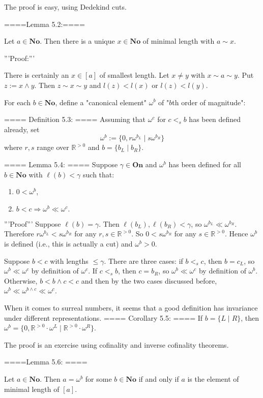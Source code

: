 The proof is easy, using Dedekind cuts.

====Lemma 5.2:====

Let $a\in \mathbf{No}$. Then there is a unique $x\in \mathbf{No}$ of minimal length with $a\sim x$.

'''Proof:'''

There is certainly an $x\in [a]$ of smallest length. Let $x\neq y$ with $x\sim a\sim y$. Put $z:=x\wedge y$. Then $z\sim x\sim y$ and $l(z)<l(x)$ or $l(z)<l(y)$.


For each $b\in\mathbf{No}$, define a "canonical element" $\omega^b$ of "$b$th order of magnitude":

==== Definition 5.3: ====
Assuming that $\omega^c$ for $c<_s b$ has been defined already, set 
$$\omega^b:=\{0,r\omega^{b_L}\mid s\omega^{b_R}\}$$
where $r,s$ range over $\mathbb{R}^{>0}$ and $b=\{b_L\mid b_R\}$.


==== Lemma 5.4: ====
Suppose $\gamma\in \mathbf{On}$ and $\omega^b$ has been defined for all $b\in \mathbf{No}$ with $\ell(b)<\gamma$ such that:
\begin{enumerate}
  \item  $0<\omega^b$,
  \item  $b<c \Rightarrow \omega^b\ll \omega^c.$
\end{enumerate}

'''Proof'''
Suppose $\ell(b)=\gamma$. Then $\ell(b_L),\ell(b_R)<\gamma$, so $\omega^{b_L} \ll \omega^{b_R}$. Therefore $r\omega^{b_L}<s\omega^{b_R}$ for any $r,s\in \mathbb{R}^{>0}$. So $0<s\omega^{b_R}$ for any $s\in \mathbb{R}^{>0}$. Hence $\omega^b$ is defined (i.e., this is actually a cut) and $\omega^b>0$.

Suppose $b<c$ with lengths $\le \gamma$. There are three cases: if $b<_s c$, then $b=c_L$, so $\omega^b\ll\omega^c$ by definition of $\omega^c$. If $c<_s b$, then $c=b_R$, so $\omega^b\ll\omega^c$ by definition of $\omega^b$. Otherwise, $b<b\wedge c<c$ and then by the two cases discussed before,
$\omega^b\ll\omega^{b\wedge c}\ll\omega^c$.


When it comes to surreal numbers, it seems that a good definition has invariance under different representations.
==== Corollary 5.5: ====
If $b=\{L\mid R\}$, then $\omega^b=\{0,\mathbb{R}^{>0}\cdot \omega^L\mid \mathbb{R}^{>0}\cdot \omega^R\}$.

The proof is an exercise using cofinality and inverse cofinality theorems.

====Lemma 5.6: ====

Let $a\in \mathbf{No}$. Then $a=\omega^b$ for some $b\in\mathbf{No}$ if and only if $a$ is the element of minimal length of $[a]$.

